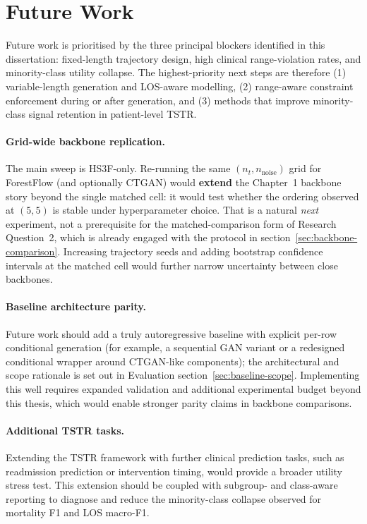 \section{Future Work}

Future work is prioritised by the three principal blockers identified in this dissertation: fixed-length trajectory design, high clinical range-violation rates, and minority-class utility collapse. The highest-priority next steps are therefore (1) variable-length generation and LOS-aware modelling, (2) range-aware constraint enforcement during or after generation, and (3) methods that improve minority-class signal retention in patient-level TSTR.

\paragraph{Grid-wide backbone replication.}
The main sweep is HS3F-only. Re-running the same $(n_t, n_{\text{noise}})$ grid for ForestFlow (and optionally CTGAN) would \textbf{extend} the Chapter~1 backbone story beyond the single matched cell: it would test whether the ordering observed at $(5,5)$ is stable under hyperparameter choice. That is a natural \emph{next} experiment, not a prerequisite for the matched-comparison form of Research Question~2, which is already engaged with the protocol in section~\ref{sec:backbone-comparison}. Increasing trajectory seeds and adding bootstrap confidence intervals at the matched cell would further narrow uncertainty between close backbones.

\paragraph{Baseline architecture parity.}
Future work should add a truly autoregressive baseline with explicit per-row conditional generation (for example, a sequential GAN variant or a redesigned conditional wrapper around CTGAN-like components); the architectural and scope rationale is set out in Evaluation section~\ref{sec:baseline-scope}. Implementing this well requires expanded validation and additional experimental budget beyond this thesis, which would enable stronger parity claims in backbone comparisons.

\paragraph{Additional TSTR tasks.}
Extending the TSTR framework with further clinical prediction tasks, such as readmission prediction or intervention timing, would provide a broader utility stress test. This extension should be coupled with subgroup- and class-aware reporting to diagnose and reduce the minority-class collapse observed for mortality F1 and LOS macro-F1.

